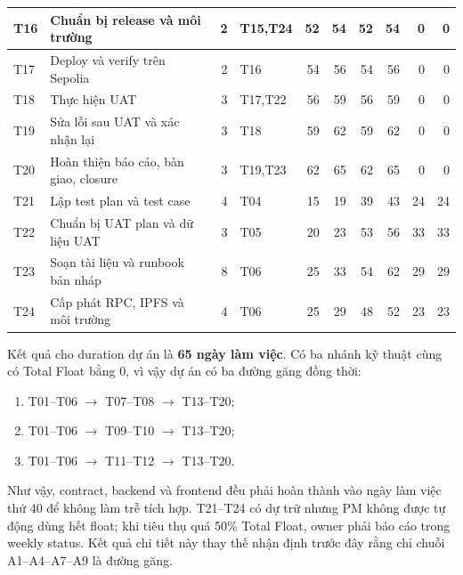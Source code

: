 \begin{landscape}
\begin{longtable}{| p{1.1cm} | p{5.2cm} | r | p{2.2cm} | r | r | r | r | r | r |}
T16 & Chuẩn bị release và môi trường & 2 & T15,T24 & 52 & 54 & 52 & 54 & 0 & 0 \\ \hline
T17 & Deploy và verify trên Sepolia & 2 & T16 & 54 & 56 & 54 & 56 & 0 & 0 \\ \hline
T18 & Thực hiện UAT & 3 & T17,T22 & 56 & 59 & 56 & 59 & 0 & 0 \\ \hline
T19 & Sửa lỗi sau UAT và xác nhận lại & 3 & T18 & 59 & 62 & 59 & 62 & 0 & 0 \\ \hline
T20 & Hoàn thiện báo cáo, bàn giao, closure & 3 & T19,T23 & 62 & 65 & 62 & 65 & 0 & 0 \\ \hline
T21 & Lập test plan và test case & 4 & T04 & 15 & 19 & 39 & 43 & 24 & 24 \\ \hline
T22 & Chuẩn bị UAT plan và dữ liệu UAT & 3 & T05 & 20 & 23 & 53 & 56 & 33 & 33 \\ \hline
T23 & Soạn tài liệu và runbook bản nháp & 8 & T06 & 25 & 33 & 54 & 62 & 29 & 29 \\ \hline
T24 & Cấp phát RPC, IPFS và môi trường & 4 & T06 & 25 & 29 & 48 & 52 & 23 & 23 \\
\hline
\end{longtable}
\end{landscape}

Kết quả cho duration dự án là \textbf{65 ngày làm việc}. Có ba nhánh kỹ thuật cùng có Total Float bằng 0, vì vậy dự án có ba đường găng đồng thời:

\begin{enumerate}
  \item T01--T06 $\rightarrow$ T07--T08 $\rightarrow$ T13--T20;
  \item T01--T06 $\rightarrow$ T09--T10 $\rightarrow$ T13--T20;
  \item T01--T06 $\rightarrow$ T11--T12 $\rightarrow$ T13--T20.
\end{enumerate}

Như vậy, contract, backend và frontend đều phải hoàn thành vào ngày làm việc thứ 40 để không làm trễ tích hợp. T21--T24 có dự trữ nhưng PM không được tự động dùng hết float; khi tiêu thụ quá 50\% Total Float, owner phải báo cáo trong weekly status. Kết quả chi tiết này thay thế nhận định trước đây rằng chỉ chuỗi A1--A4--A7--A9 là đường găng.


